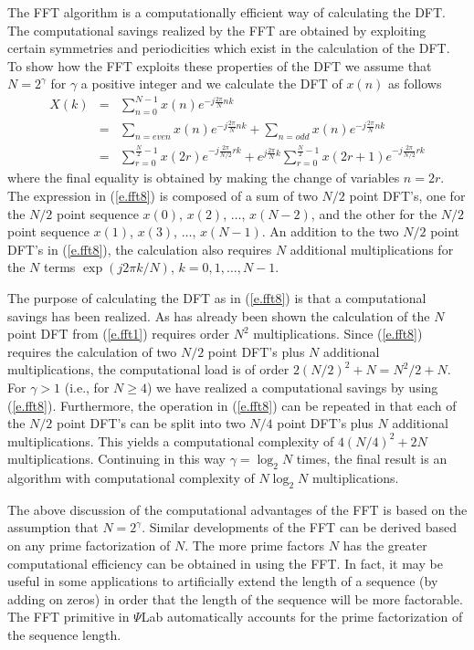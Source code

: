 	The FFT algorithm is a computationally
efficient way of calculating the DFT.  The computational
savings realized by the FFT are obtained by
exploiting certain symmetries and periodicities which exist in the
calculation of the DFT.  To show how the FFT
exploits these properties of the DFT we assume that $N=2^{\gamma}$
for $\gamma$ a positive integer and we calculate
the DFT of $x(n)$ as follows
%
\begin{eqnarray}
X(k)&=&\sum_{n=0}^{N-1}x(n)e^{-j\frac{2\pi}{N}nk}\nonumber\\
    &=&\sum_{n=even}x(n)e^{-j\frac{2\pi}{N}nk}+\sum_{n=odd}x(n)e^{-j\frac{2\pi}{N}nk}\nonumber\\
    &=&\sum_{r=0}^{\frac{N}{2}-1}x(2r)e^{-j\frac{2\pi}{N/2}rk}+e^{j\frac{2\pi}{N}k}\sum_{r=0}^{\frac{N}{2}-1}x(2r+1)e^{-j\frac{2\pi}{N/2}rk}
\label{e.fft8}
\end{eqnarray}
%
where the final equality is obtained by making
the change of variables $n=2r$.  The expression in (\ref{e.fft8})
is composed of a sum of two $N/2$ point DFT's, 
one for the $N/2$ point sequence $x(0)$, $x(2)$, $\ldots$, $x(N-2)$,
and the other for the $N/2$ point sequence $x(1)$, $x(3)$, $\ldots$, $x(N-1)$.
An addition to the two $N/2$ point DFT's in (\ref{e.fft8}), the
calculation also requires $N$ additional multiplications
for the $N$ terms $\exp(j2\pi k/N)$, $k=0,1,\ldots,N-1$.

	The purpose of calculating the DFT as in 
(\ref{e.fft8}) is that a computational savings has been realized.
As has already been shown the calculation of the $N$ point DFT
from (\ref{e.fft1}) requires order $N^2$ multiplications.  Since
(\ref{e.fft8}) requires the calculation of two $N/2$ point DFT's
plus $N$ additional multiplications, the computational load
is of order $2(N/2)^2+N=N^2/2+N$.  For $\gamma>1$ 
(i.e., for $N\ge4$) we have realized a computational savings
by using (\ref{e.fft8}).  Furthermore, the operation in (\ref{e.fft8})
can be repeated in that each of the $N/2$ point
DFT's can be split into two $N/4$ point DFT's
plus $N$ additional multiplications.
This yields a computational complexity of $4(N/4)^2+2N$ multiplications.
Continuing in this way $\gamma=\log_2N$ times, the final result
is an algorithm with computational complexity of $N\log_2N$ multiplications.

	The above discussion of the computational advantages of the FFT
is based on the assumption that $N=2^{\gamma}$.  Similar developments
of the FFT can be derived based on any prime factorization of $N$.
The more prime factors $N$ has the greater computational efficiency
can be obtained in using the FFT.  In fact, it may be useful in some
applications to artificially extend the length of a sequence (by adding on
zeros) in order that the length of the sequence will be more factorable.
The FFT primitive in $\Psi$Lab automatically accounts for the prime
factorization of the sequence length. 

